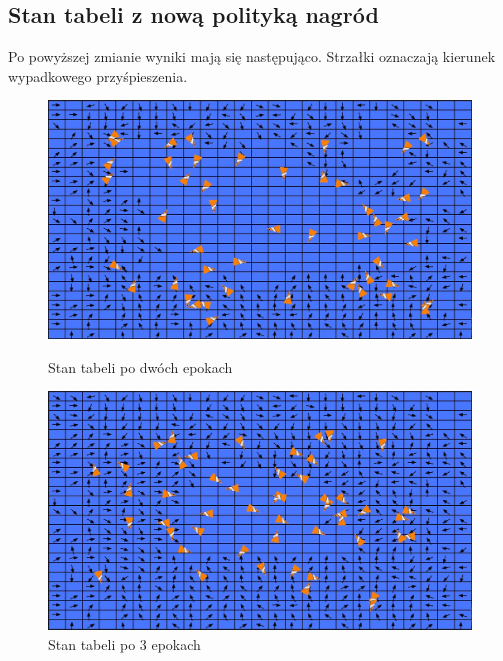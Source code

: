 \documentclass{article}
\begin{document}
\subsection{Stan tabeli z nową polityką nagród} 
Po powyższej zmianie wyniki mają się następująco. Strzałki oznaczają kierunek wypadkowego przyśpieszenia.

    \begin{figure}[H]
        \begin{minipage}[h]{0.48\textwidth}
            \centering
            \includegraphics[width=\textwidth]{2_Qtable_after_2nd_epoch.jpg}
            \caption{Stan tabeli po dwóch epokach}
        \end{minipage}
        \hspace{0.02\textwidth}
        \begin{minipage}[h]{0.48\textwidth}
            \centering
            \includegraphics[width=\textwidth]{3_Qtable_after_3rd_epoch.jpg}    
            \caption{Stan tabeli po 3 epokach}
        \end{minipage}
    \end{figure}
\end{document}
